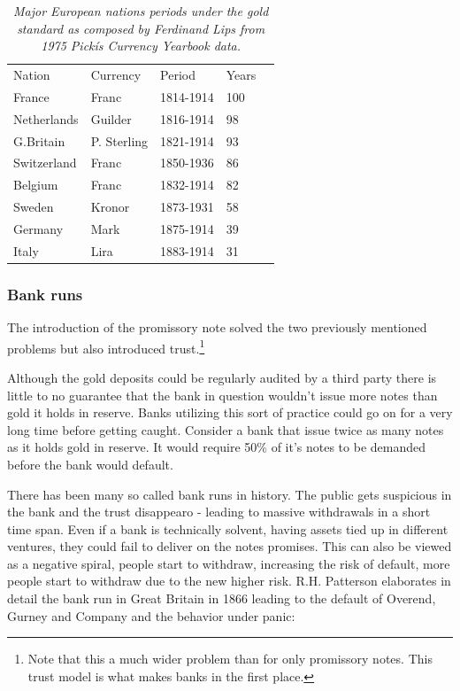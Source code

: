 \begin{table}[!htb]
	\begin{tabular}{lllll}
		Nation & Currency & Period & Years \\
		France & Franc & 1814-1914 & 100 \\
		Netherlands & Guilder & 1816-1914 & 98 \\
		G.Britain & P. Sterling & 1821-1914 & 93 \\
		Switzerland & Franc & 1850-1936 & 86 \\
		Belgium & Franc & 1832-1914 & 82 \\
		Sweden & Kronor & 1873-1931 & 58 \\
		Germany & Mark & 1875-1914 & 39 \\
		Italy & Lira & 1883-1914 & 31 \\   
	\end{tabular}
	\caption{\textit{ Major European nations periods under the gold standard
			as composed by Ferdinand Lips\cite{lips:gold:wars} from 1975 Pickís Currency Yearbook data.
	}}
	\label{tab:gold:standard}
\end{table}

\subsubsection{Bank runs}

The introduction of the promissory note solved the two previously mentioned problems but also 
introduced trust.\footnote{Note that this a much wider problem than for only promissory notes. This trust model is what makes banks in the first place.} 

Although the gold deposits could be regularly audited by a third party there is little to no guarantee that the bank in question wouldn't issue more notes than gold it holds in reserve. Banks utilizing this sort of practice could go on for a very long time before getting caught. Consider a bank that issue twice as many notes as it holds gold in reserve. It would require 50\% of it's notes to be demanded before the bank would default.  
  
There has been many so called bank runs in history. The public gets suspicious in the bank and the trust disappearo - leading to massive withdrawals in a short time span. Even if a bank is technically solvent, having assets tied up in different ventures, they could fail to deliver on the notes promises. This can also be viewed as a negative spiral, people start to withdraw, increasing the risk of default, more people start to withdraw due to the new higher risk. R.H. Patterson elaborates in detail the bank run in Great Britain in 1866 leading to the default of Overend, Gurney and Company and the behavior under panic: 

